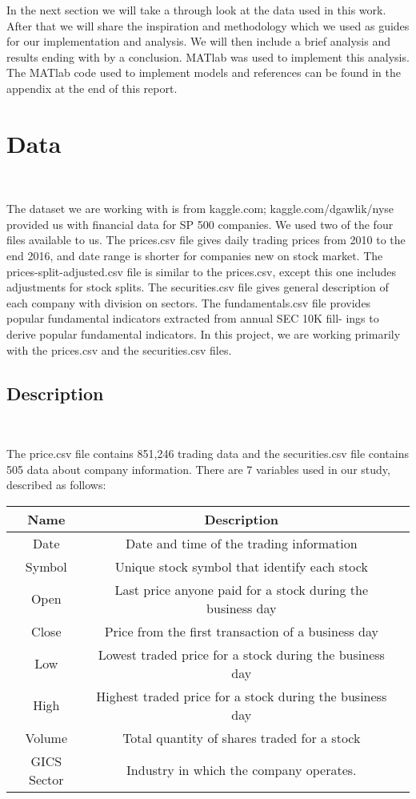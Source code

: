 \documentclass[11pt, oneside]{article}   	%
\begin{document}
In the next section we will take a through look at the data used in this work. After that we will share the inspiration and methodology which we used as guides for our implementation and analysis. We will then include a brief analysis and results ending with by a conclusion. MATlab was used to implement this analysis. The MATlab code used to implement models and references can be found in the appendix at the end of this report.

\newpage

\section{Data} \

The dataset we are working with is from kaggle.com; kaggle.com/dgawlik/nyse provided us with financial data for SP 500 companies. We used two of the four files available to us. The prices.csv file gives daily trading prices from 2010 to the end 2016, and date range is shorter for companies new on stock market. The prices-split-adjusted.csv file is similar to the prices.csv, except this one includes adjustments for stock splits. The securities.csv file gives general description of each company with division on sectors. The fundamentals.csv file provides popular fundamental indicators extracted from annual SEC 10K fill- ings to derive popular fundamental indicators. In this project, we are working primarily with the prices.csv and the securities.csv files.

\subsection{Description} \

The price.csv file contains 851,246 trading data and the securities.csv file contains 505 data about company information. There are 7 variables used in our study, described as follows:

\begin{center}
\begin{tabular}{ |c|c|c| } 
 \hline
 Name & Description \\ 
 \hline
 Date & Date and time of the trading information \\ 
 \hline
 Symbol & Unique stock symbol that identify each stock \\ 
 \hline
 Open & Last price anyone paid for a stock during the business day \\ 
 \hline
 Close &  Price from the first transaction of a business day  \\ 
 \hline
 Low & Lowest traded price for a stock during the business day  \\
 \hline
 High & Highest traded price for a stock during the business day  \\ 
 \hline
 Volume & Total quantity of shares traded for a stock \\ 
 \hline
 GICS Sector & Industry in which the company operates.  \\ 

 \hline
\end{tabular}
\end{center}
\end{document}
